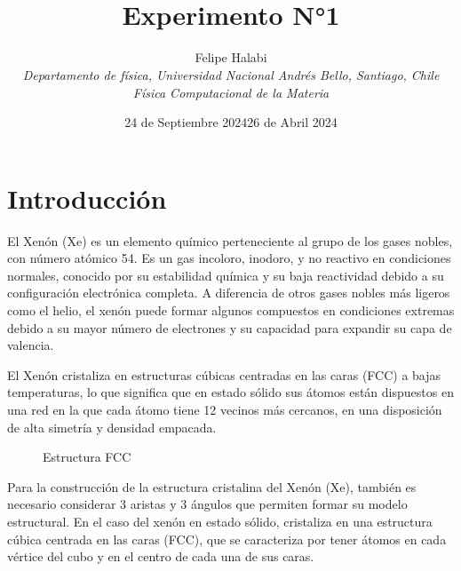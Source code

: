 \documentclass[10pt,letterpaper,twocolumn]{article}
\title{\noindent\\[-4cm]\bfseries Experimento N°1}
\author{Felipe Halabi
\\\small\itshape \textit{Departamento de física, Universidad Nacional Andrés Bello, Santiago, Chile}
\\\small\itshape Física Computacional de la Materia}
\date{24 de Septiembre 2024}
\date{26 de Abril 2024}
\begin{document}
\renewcommand{\tablename}{Tabla}
\section*{Introducción}
El Xenón (Xe) es un elemento químico perteneciente al grupo de los gases nobles, con número atómico 54. Es un gas incoloro, inodoro, y no reactivo en condiciones normales, conocido por su estabilidad química y su baja reactividad debido a su configuración electrónica completa. A diferencia de otros gases nobles más ligeros como el helio, el xenón puede formar algunos compuestos en condiciones extremas debido a su mayor número de electrones y su capacidad para expandir su capa de valencia.

El Xenón cristaliza en estructuras cúbicas centradas en las caras (FCC) a bajas temperaturas, lo que significa que en estado sólido sus átomos están dispuestos en una red en la que cada átomo tiene 12 vecinos más cercanos, en una disposición de alta simetría y densidad empacada.

\begin{figure}[h!]
    \centering
    
    \vspace*{-5mm}
    \caption{Estructura FCC}
\end{figure}

Para la construcción de la estructura cristalina del Xenón (Xe), también es necesario considerar 3 aristas y 3 ángulos que permiten formar su modelo estructural. En el caso del xenón en estado sólido, cristaliza en una estructura cúbica centrada en las caras (FCC), que se caracteriza por tener átomos en cada vértice del cubo y en el centro de cada una de sus caras.
\end{document}
